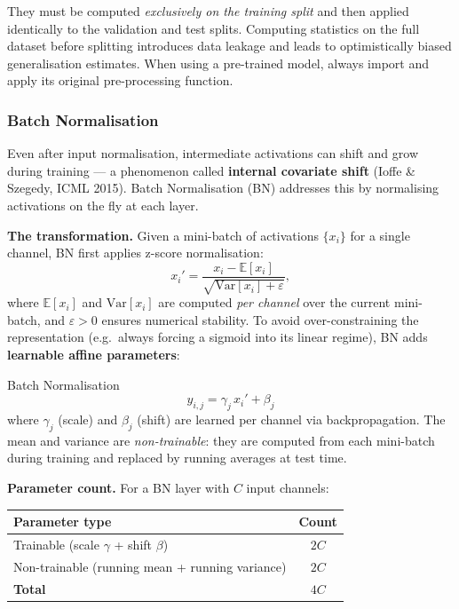 \documentclass[11pt,a4paper]{article}
\newcommand{\term}[1]{\textcolor{DefGreen}{\textbf{#1}}\index{#1}}
\begin{document}
\begin{warnbox}
They must be computed \emph{exclusively on the training split} and then applied identically to the validation and test splits. Computing statistics on the full dataset before splitting introduces data leakage and leads to optimistically biased generalisation estimates. When using a pre-trained model, always import and apply its original pre-processing function.
\end{warnbox}

\subsubsection{Batch Normalisation}
\label{sec:batchnorm2}

Even after input normalisation, intermediate activations can shift and grow during training — a phenomenon called \term{internal covariate shift} (Ioffe \& Szegedy, ICML 2015). Batch Normalisation (BN) addresses this by normalising activations on the fly at each layer.

\textbf{The transformation.} Given a mini-batch of activations $\{x_i\}$ for a single channel, BN first applies z-score normalisation:
\[
x_i' = \frac{x_i - \mathbb{E}[x_i]}{\sqrt{\mathrm{Var}[x_i] + \varepsilon}},
\]
where $\mathbb{E}[x_i]$ and $\mathrm{Var}[x_i]$ are computed \emph{per channel} over the current mini-batch, and $\varepsilon>0$ ensures numerical stability. To avoid over-constraining the representation (e.g.\ always forcing a sigmoid into its linear regime), BN adds \textbf{learnable affine parameters}:

\begin{defbox}{Batch Normalisation}
\[
y_{i,j} = \gamma_j \, x_i' + \beta_j
\]
where $\gamma_j$ (scale) and $\beta_j$ (shift) are learned per channel via backpropagation. The mean and variance are \emph{non-trainable}: they are computed from each mini-batch during training and replaced by running averages at test time.
\end{defbox}

\textbf{Parameter count.} For a BN layer with $C$ input channels:

\begin{center}
\begin{tabular}{lc}
\toprule
Parameter type & Count \\
\midrule
Trainable (scale $\gamma$ + shift $\beta$) & $2C$ \\
Non-trainable (running mean + running variance) & $2C$ \\
\midrule
\textbf{Total} & $4C$ \\
\bottomrule
\end{tabular}
\end{center}
\end{document}
